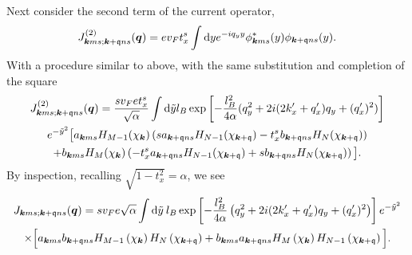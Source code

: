 Next consider the second term of the current operator,
\begin{equation}
  \label{eq:103}
  J_{\bm{k} m s; \bm{k} + \mathfrak{q} n s}^{(2)} (\bm{q}) =
  e v_{F} t^s_{x}
  \int \mathrm{d} y
  e^{-iq_{y} y}
  \phi ^{*}_{\bm{k} m s}(y)  \phi _{\bm{k} + \mathfrak{q} n s}(y).
\end{equation}
With a procedure similar to above, with the same substitution and completion of the square
\begin{multline}
  \label{eq:105}
  J_{\bm{k} m s; \bm{k} + \mathfrak{q} n s}^{(2)} (\bm{q}) =
  \frac{s v_F e t^s_x}{\sqrt{\alpha}}
  \int \mathrm{d} \tilde{y} l_B
    \exp \left[
      -\frac{l_{B}^2}{4 \alpha } (q_{y}^2 + 2i (2 k'_x + q' _x) q_{y}  + (q'_x)^2 )
    \right]\\
  e^{-\tilde{y}^2} \big[
    a_{\bm{k} m s} H_{M-1}( \chi _{\bm{k}} ) \left(s a_{\bm{k} + \mathfrak{q} n s} H_{N-1}( \chi _{\bm{k} + \mathfrak{q}} ) - t^s_{x} b_{\bm{k} + \mathfrak{q} n s} H_{N}( \chi _{\bm{k} + \mathfrak{q}} ) \right)\\
   +
    b_{\bm{k} m s} H_{M}( \chi _{\bm{k}} ) \left(- t^s_{x} a_{\bm{k} + \mathfrak{q} n s} H_{N-1}( \chi _{\bm{k} + \mathfrak{q}} ) + s b_{\bm{k} + \mathfrak{q} n s} H_{N}( \chi _{\bm{k} + \mathfrak{q}} ) \right)
    \big].
\end{multline}
By inspection,  recalling \( \sqrt{1 - t_x^2} = \alpha \), we see
{%
\setlength\multlinegap{0pt}  %
\begin{multline}
J_{\bm{k}ms; \bm{k}+\mathfrak{q} ns}(\bm{q}) =
  s v_F e \sqrt{\alpha} \int \mathrm{d}\tilde{y} \: l_B
  \exp \left[
    -\frac{l_{B}^2}{4 \alpha } \left(q_{y}^2 + 2i (2 k' _x + q' _x) q_{y} + (q'_x)^2 \right)
  \right]
  e^{-\tilde{y}^2}
  \\
  \times
  \Big[
  a_{\bm{k}ms}b_{\bm{k} + \mathfrak{q} ns}
  H_{M-1} \left(  \chi_{\bm{k}} \right)
  H_N\left( \chi_{\bm{k} + \mathfrak{q}} \right)
  +
  b_{\bm{k}ms} a_{\bm{k} + \mathfrak{q} ns}
  H_M \left( \chi_{\bm{k}} \right)
  H_{N-1} \left( \chi_{\bm{k} + \mathfrak{q}} \right)
  \Big].
\end{multline}
}

